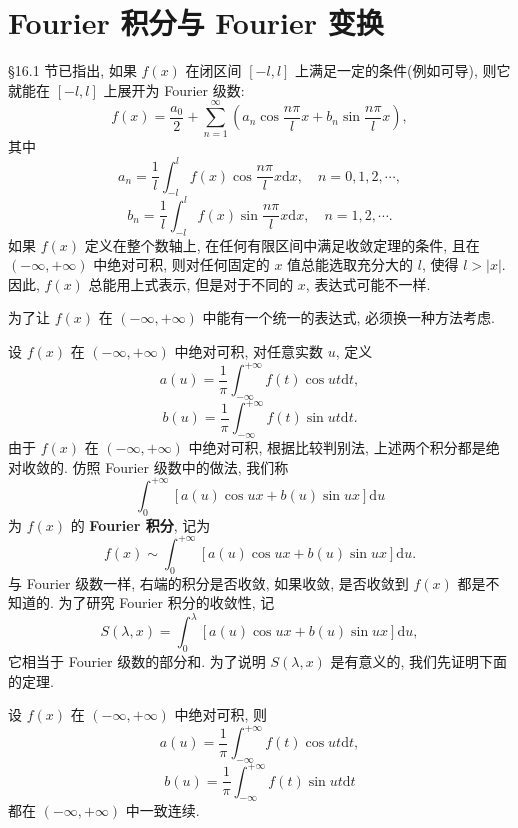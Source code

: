 \section{Fourier 积分与 Fourier 变换}\label{sec:16.3}

\S16.1 节已指出, 如果 $f(x)$ 在闭区间 $[-l,l]$ 上满足一定的条件(例如可导), 则它就能在 $[-l,l]$ 上展开为 Fourier 级数:
\[
  f(x)=\frac{a_{0}}{2}+\sum_{n=1}^{\infty}\left(a_{n}\cos\frac{n\pi}{l}x+b_{n}\sin\frac{n\pi}{l}x\right),
\]
其中
\[
  a_{n}=\frac{1}{l}\int_{-l}^{l}f(x)\cos\frac{n\pi}{l}x\mathrm{d}x,\quad n=0,1,2,\cdots,
\]
\[
  b_{n}=\frac{1}{l}\int_{-l}^{l}f(x)\sin\frac{n\pi}{l}x\mathrm{d}x,\quad n=1,2,\cdots.
\]
如果 $f(x)$ 定义在整个数轴上, 在任何有限区间中满足收敛定理的条件, 且在 $(-\infty,+\infty)$ 中绝对可积, 则对任何固定的 $x$ 值总能选取充分大的 $l$, 使得 $l>|x|$. 因此, $f(x)$ 总能用上式表示, 但是对于不同的 $x$, 表达式可能不一样.

为了让 $f(x)$ 在 $(-\infty,+\infty)$ 中能有一个统一的表达式, 必须换一种方法考虑.

设 $f(x)$ 在 $(-\infty,+\infty)$ 中绝对可积, 对任意实数 $u$, 定义
\[
  a(u)=\frac{1}{\pi}\int_{-\infty}^{+\infty}f(t)\cos ut\mathrm{d}t,
\]
\[
  b(u)=\frac{1}{\pi}\int_{-\infty}^{+\infty}f(t)\sin ut\mathrm{d}t.
\]
由于 $f(x)$ 在 $(-\infty,+\infty)$ 中绝对可积, 根据比较判别法, 上述两个积分都是绝对收敛的. 仿照 Fourier 级数中的做法, 我们称
\[
  \int_{0}^{+\infty}\left[a(u)\cos ux+b(u)\sin ux\right]\mathrm{d}u
\]
为 $f(x)$ 的 \textbf{Fourier 积分}, 记为
\[
  f(x)\sim\int_{0}^{+\infty}\left[a(u)\cos ux+b(u)\sin ux\right]\mathrm{d}u.
\]
与 Fourier 级数一样, 右端的积分是否收敛, 如果收敛, 是否收敛到 $f(x)$ 都是不知道的. 为了研究 Fourier 积分的收敛性, 记
\[
  S(\lambda,x)=\int_{0}^{\lambda}\left[a(u)\cos ux+b(u)\sin ux\right]\mathrm{d}u,
\]
它相当于 Fourier 级数的部分和. 为了说明 $S(\lambda,x)$ 是有意义的, 我们先证明下面的定理.

\begin{theorem}\label{thm:16.3.1}
设 $f(x)$ 在 $(-\infty,+\infty)$ 中绝对可积, 则
\[
  a(u)=\frac{1}{\pi}\int_{-\infty}^{+\infty}f(t)\cos ut\mathrm{d}t,
\]
\[
  b(u)=\frac{1}{\pi}\int_{-\infty}^{+\infty}f(t)\sin ut\mathrm{d}t
\]
都在 $(-\infty,+\infty)$ 中一致连续.
\end{theorem}

